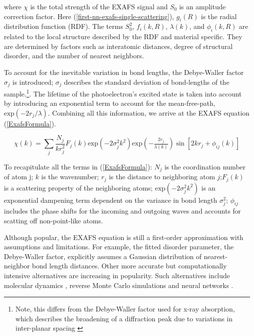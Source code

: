 \noindent where $ \chi $ is the total strength of the EXAFS signal and $ S_0$ is an amplitude correction factor. Here (\ref{first-nn-exafs-single-scattering}), $g_i(R)$ is the radial distribution function (RDF). The terms $ S_0^2 $, $ f_i (k, R) $, $\lambda(k)$, and $\phi_i(k, R)$ are related to the local structure described by the RDF and material specific. They are determined by factors such as interatomic distances, degree of structural disorder, and the number of nearest neighbors.

To account for the inevitable variation in bond lengths, the Debye-Waller factor $ \sigma_j $ is introduced; $ \sigma_j $ describes the standard deviation of bond-lengths of the sample.\footnote{Note, this differs from the Debye-Waller factor used for x-ray absorption, which describes the broadening of a diffraction peak due to variations in inter-planar spacing \cite{DW-diffraction}}. The lifetime of the photoelectron's excited state is taken into account by introducing an exponential term to account for the mean-free-path, $ \text{exp}({-2r_j/\lambda}) $. Combining all this information, we arrive at the EXAFS equation (\ref{ExafsFormula}). 

\begin{equation}
    \label{ExafsFormula}
    \chi(k) = \sum_j \frac{N_j}{kr_j^2}F_j(k)\text{exp}({-2\sigma_j^2k^2})\text{exp}({-\tfrac{2r_j}{\lambda(k)}})\sin[2kr_j + \phi_{ij}(k)]
\end{equation}

\noindent

To recapitulate all the terms in (\ref{ExafsFormula}): $ N_j  $ is the coordination number of atom j; $ k $  is the wavenumber; $ r_j $ is the distance to neighboring atom $ j $;$ F_j(k) $  is a scattering property of the neighboring atoms; $ \text{exp}({-2\sigma_j^2k^2}) $ is an exponential dampening term dependent on the variance in bond length $ \sigma_j^2 $; $ \phi_{ij} $ includes the phase shifts for the incoming and outgoing waves and  accounts for scatting off non-point-like atoms.    

Although popular, the EXAFS equation is still a first-order approximation with assumptions and limitations. For example, the fitted disorder parameter, the Debye-Waller factor, explicitly assumes a Gaussian distribution of nearest-neighbor bond length distances. Other more accurate but computationally intensive alternatives are increasing in popularity. Such alternatives include molecular dynamics \cite{mol-dyn-xanes}, reverse Monte Carlo simulations \cite{RMC-xanes} and neural networks \cite{lin2020machine} \cite{timoshenko2018neural}.

